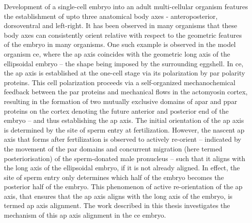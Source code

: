 Development of a single-cell embryo into an adult multi-cellular organism features the establishment of upto three anatomical body axes - anteroposterior, dorsoventral and left-right. It has been observed in many organisms that these body axes can consistently orient relative with respect to the geometric features of the embryo in many organisms. One such example is observed in the model organism \acf{ce}, where the \acf{ap} axis coincides with the geometric long axis of the ellipsoidal embryo -- the shape being imposed by the surrounding eggshell. In \acs{ce}, the \acs{ap} axis is established at the one-cell stage via its polarization by \acs{par} polarity proteins. This cell polarization proceeds via a self-organized mechanochemical feedback between the \acs{par} proteins and mechanical flows in the actomyosin cortex, resulting in the formation of two mutually exclusive domains of \acl{apar} and \acl{ppar} proteins on the cortex denoting the future anterior and posterior end of the embryo -- and thus establishing the \acs{ap} axis. The initial orientation of the \acs{ap} axis is determined by the site of sperm entry at fertilization. However, the nascent \acs{ap} axis that forms after fertilization is observed to actively re-orient -- indicated by the movement of the \acs{par} domains and concurrent migration (here termed posteriorisation) of the sperm-donated male pronucleus -- such that it aligns with the long axis of the ellipsoidal embryo, if it is not already aligned. In effect, the site of sperm entry only determines which half of the embryo becomes the posterior half of the embryo. This phenomenon of active re-orientation of the \acs{ap} axis, that ensures that the \acs{ap} axis aligns with the long axis of the embryo, is termed \acs{ap} axis alignment. The work described in this thesis investigates the mechanism of this \acs{ap} axis alignment in the \acs{ce} embryo.

